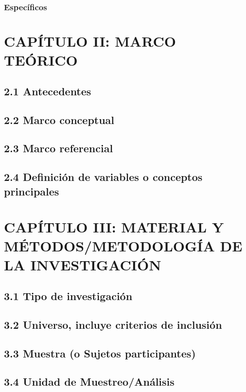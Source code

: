 \documentclass[12pt]{../componentes/uns}
\begin{document}
\subsubsection{Específicos}
\lipsum[10]

\newpage
\section{CAPÍTULO II: MARCO TEÓRICO}
\subsection{2.1 Antecedentes}
\lipsum[11]

\subsection{2.2 Marco conceptual}
\lipsum[12]

\subsection{2.3 Marco referencial}
\lipsum[13]

\subsection{2.4 Definición de variables o conceptos principales}
\lipsum[14]

\newpage
\section{CAPÍTULO III: MATERIAL Y MÉTODOS/METODOLOGÍA DE LA INVESTIGACIÓN}
\subsection{3.1 Tipo de investigación}
\lipsum[15]

\subsection{3.2 Universo, incluye criterios de inclusión}
\lipsum[16]

\subsection{3.3 Muestra (o Sujetos participantes)}
\lipsum[17]

\subsection{3.4 Unidad de Muestreo/Análisis}
\lipsum[18]
\end{document}
